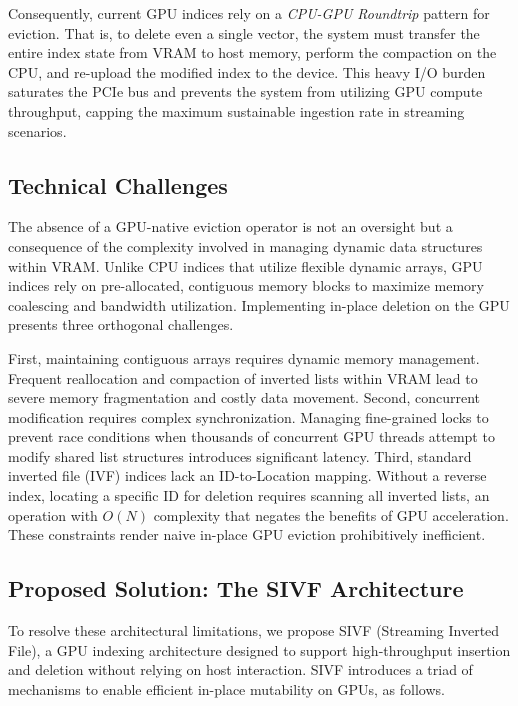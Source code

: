 \documentclass[sigconf,nonacm]{acmart}
\theoremstyle{plain}
\theoremstyle{definition}
\theoremstyle{remark}
\begin{document}
Consequently, current GPU indices rely on a \emph{CPU-GPU Roundtrip} pattern for eviction. That is, to delete even a single vector, the system must transfer the entire index state from VRAM to host memory, perform the compaction on the CPU, and re-upload the modified index to the device. This heavy I/O burden saturates the PCIe bus and prevents the system from utilizing GPU compute throughput, capping the maximum sustainable ingestion rate in streaming scenarios.

\subsection{Technical Challenges}
\label{sec:technical_challenges}

The absence of a GPU-native eviction operator is not an oversight but a consequence of the complexity involved in managing dynamic data structures within VRAM. Unlike CPU indices that utilize flexible dynamic arrays, GPU indices rely on pre-allocated, contiguous memory blocks to maximize memory coalescing and bandwidth utilization. Implementing in-place deletion on the GPU presents three orthogonal challenges.

First, maintaining contiguous arrays requires dynamic memory management. Frequent reallocation and compaction of inverted lists within VRAM lead to severe memory fragmentation and costly data movement. Second, concurrent modification requires complex synchronization. Managing fine-grained locks to prevent race conditions when thousands of concurrent GPU threads attempt to modify shared list structures introduces significant latency. Third, standard inverted file (IVF) indices lack an ID-to-Location mapping. Without a reverse index, locating a specific ID for deletion requires scanning all inverted lists, an operation with $O(N)$ complexity that negates the benefits of GPU acceleration. These constraints render naive in-place GPU eviction prohibitively inefficient.

\subsection{Proposed Solution: The SIVF Architecture}
\label{sec:proposed_work}

To resolve these architectural limitations, we propose SIVF (Streaming Inverted File), a GPU indexing architecture designed to support high-throughput insertion and deletion without relying on host interaction. SIVF introduces a triad of mechanisms to enable efficient in-place mutability on GPUs, as follows.
\end{document}

